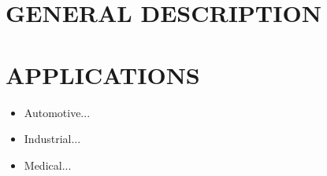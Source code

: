 \documentclass{../templates/datasheet}
\begin{document}
\section{GENERAL DESCRIPTION}


\section{APPLICATIONS} %

\begin{itemize}
	\item Automotive...
	\item Industrial...
	\item Medical...
\end{itemize}


\pagebreak

\tableofcontents
\pagebreak

\end{document}
